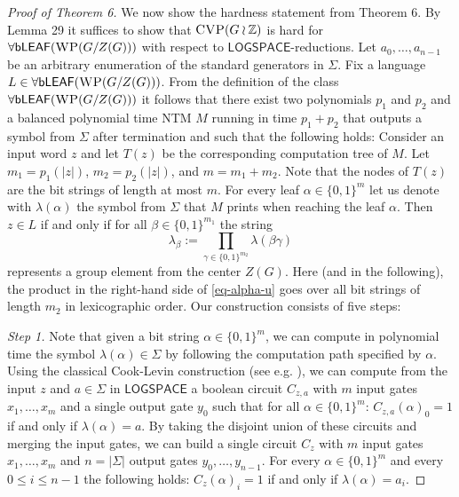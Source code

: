 \documentclass[10pt,a4paper]{article}
\newcommand{\WP}{\textsc{WP}\xspace}
\newcommand{\bLEAF}{\mathsf{bLEAF}}
\newcommand{\CVP}{\textsc{CVP}\xspace}
\renewcommand{\L}{\ensuremath{\mathsf{LOGSPACE}}\xspace}
\begin{document}
\begin{proof}[Proof of Theorem 6]
We now show the hardness statement from Theorem 6.
By Lemma 29 it suffices to show that $\CVP(G \wr \mathbb{Z})$ 
is hard for $\forall\bLEAF(\WP(G/Z(G)))$ with respect to \L-reductions. Let $a_0, \ldots, a_{n-1}$ be an arbitrary enumeration of the standard generators in $\Sigma$.
Fix a language $L \in \forall\bLEAF(\WP(G/Z(G)))$. From the definition of the class $\forall\bLEAF(\WP(G/Z(G)))$ it follows that
there exist two polynomials $p_1$ and $p_2$ and a balanced polynomial time NTM $M$ running in time $p_1+p_2$
that outputs a symbol from $\Sigma$ after termination and such that the following holds: Consider an input word
$z$ and let $T(z)$ be the corresponding computation tree of $M$. 
Let $m_1 = p_1(|z|)$, $m_2 = p_2(|z|)$, and $m = m_1+m_2$. Note that the nodes of $T(z)$ are the bit strings of length at most $m$.
For every leaf $\alpha \in \{0,1\}^m$ let us denote with $\lambda(\alpha)$ the symbol from $\Sigma$ that $M$ prints 
when reaching the leaf $\alpha$. Then $z \in L$ if and only if for all
$\beta \in \{0,1\}^{m_1}$ the string 
\begin{equation} \label{eq-alpha-u}
\lambda_\beta := \prod_{\gamma \in \{0,1\}^{m_2}}\lambda(\beta\gamma)
\end{equation}
represents a group element from the center $Z(G)$. Here (and in the following), the product in the right-hand side of  \eqref{eq-alpha-u} goes over all bit strings of length $m_2$
in lexicographic order.
Our construction consists of five steps:

\medskip
\noindent
{\em Step 1.}
Note that given a bit string $\alpha \in \{0,1\}^m$, we can 
compute in polynomial time the symbol $\lambda(\alpha) \in \Sigma$ by following the computation path specified by $\alpha$. 
Using the classical Cook-Levin construction 
(see e.g. \cite{ref2}), we can compute from the input $z$ and $a \in \Sigma$  in \L
a boolean circuit $C_{z,a}$ with $m$ input gates $x_1, \ldots, x_m$ and a single output gate $y_0$
such that for all $\alpha \in \{0,1\}^m$:
$C_{z,a}(\alpha)_0 = 1$ if and only if $\lambda(\alpha) = a$. 
By taking the disjoint union of these circuits and merging the input gates,
we can build a single circuit $C_z$ with $m$ input gates $x_1, \ldots, x_m$
and $n = |\Sigma|$ output gates $y_0, \ldots, y_{n-1}$. For every $\alpha \in \{0,1\}^m$ and every
$0 \leq i \leq n-1$ the following holds: $C_z(\alpha)_i = 1$ if and only if $\lambda(\alpha) = a_i$.


\end{proof}
\end{document}
